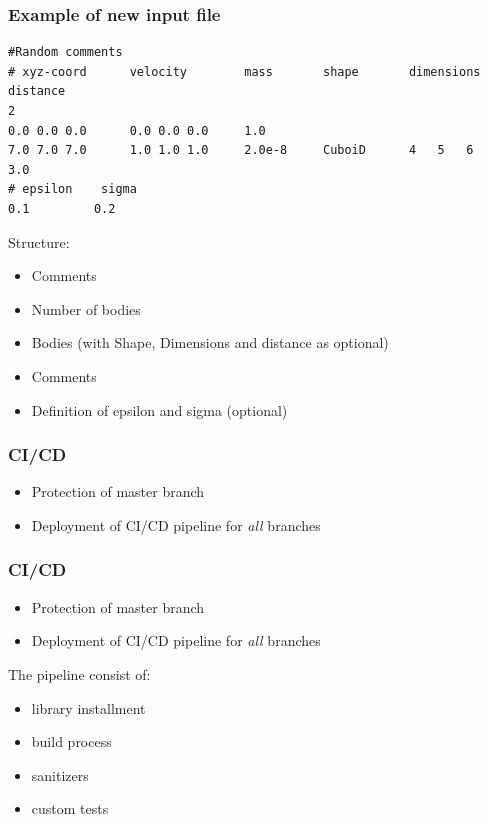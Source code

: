 

\begin{frame}[fragile]
\frametitle{Example of new input file}

 \begin{Verbatim}
#Random comments
# xyz-coord      velocity        mass       shape       dimensions      distance  
2
0.0 0.0 0.0      0.0 0.0 0.0     1.0
7.0 7.0 7.0      1.0 1.0 1.0     2.0e-8     CuboiD      4	5	6         3.0
# epsilon    sigma
0.1         0.2
 \end{Verbatim}

\vspace{-0.5cm}
\large
Structure:
\vspace{-0.7cm}
\begin{itemize}
	\item<1-> Comments
	\item<1-> Number of bodies
	\item<2-> Bodies (with Shape, Dimensions and distance as optional)
	\item<3-> Comments
	\item<4- > Definition of epsilon and sigma (optional)
\end{itemize}

\end{frame}

\begin{frame}
	\frametitle{CI/CD}
	\large
	\begin{itemize}
		\item<1-> Protection of master branch
		\item<2-> Deployment of CI/CD pipeline for \textit{all} branches 
	\end{itemize}

\end{frame}

\begin{frame}
	\frametitle{CI/CD}
	\large
	\begin{itemize}
		\item Protection of master branch
		\item Deployment of CI/CD pipeline for \textit{all} branches 
	\end{itemize}
	\Large
	The pipeline consist of:
	\large
	\begin{itemize}
		\item<1-> library installment
		\item<2-> build process
		\item<3-> sanitizers
		\item<4-> custom tests
	\end{itemize}
\end{frame}

